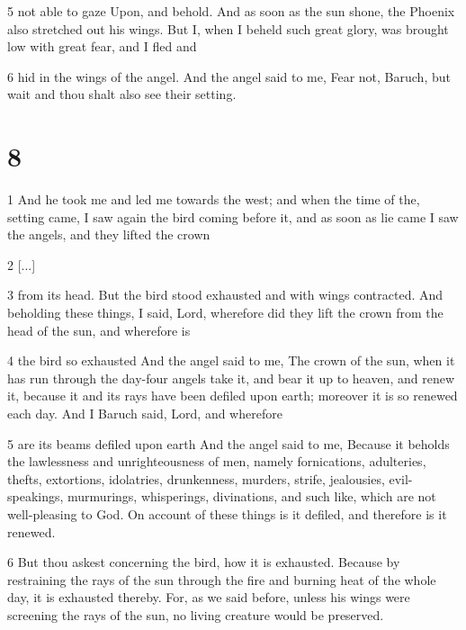 \par 5 not able to gaze Upon, and behold. And as soon as the sun shone, the Phoenix also stretched out his wings. But I, when I beheld such great glory, was brought low with great fear, and I fled and

\par 6 hid in the wings of the angel. And the angel said to me, Fear not, Baruch, but wait and thou shalt also see their setting.

\chapter{8}

\par 1 And he took me and led me towards the west; and when the time of the, setting came, I saw again the bird coming before it, and as soon as lie came I saw the angels, and they lifted the crown 

\par 2 [...]

\par 3 from its head. But the bird stood exhausted and with wings contracted. And beholding these things, I said, Lord, wherefore did they lift the crown from the head of the sun, and wherefore is

\par 4 the bird so exhausted And the angel said to me, The crown of the sun, when it has run through the day-four angels take it, and bear it up to heaven, and renew it, because it and its rays have been defiled upon earth; moreover it is so renewed each day. And I Baruch said, Lord, and wherefore

\par 5 are its beams defiled upon earth And the angel said to me, Because it beholds the lawlessness and unrighteousness of men, namely fornications, adulteries, thefts, extortions, idolatries, drunkenness, murders, strife, jealousies, evil-speakings, murmurings, whisperings, divinations, and such like, which are not well-pleasing to God. On account of these things is it defiled, and therefore is it renewed.

\par 6 But thou askest concerning the bird, how it is exhausted. Because by restraining the rays of the sun through the fire and burning heat of the whole day, it is exhausted thereby. For, as we said before, unless his wings were screening the rays of the sun, no living creature would be preserved.

